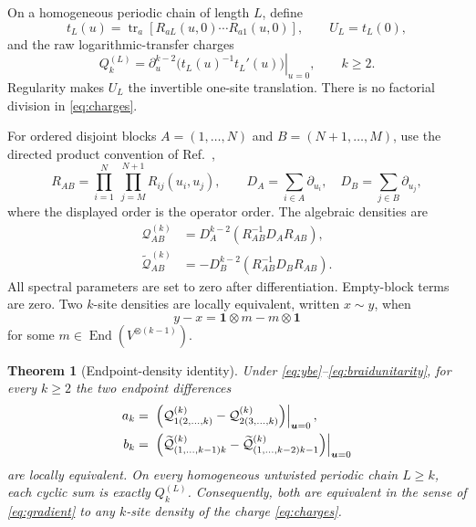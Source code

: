 \documentclass[11pt,a4paper]{article}
\newtheorem{theorem}{Theorem}[section]
\theoremstyle{definition}
\theoremstyle{remark}
\newcommand{\End}{\operatorname{End}}
\newcommand{\tr}{\operatorname{tr}}
\newcommand{\cQ}{\mathcal{Q}}
\newcommand{\tcQ}{\widetilde{\mathcal{Q}}}
\begin{document}
On a homogeneous periodic chain of length $L$, define
\begin{equation}
 t_L(u)=\tr_a\!\left[R_{aL}(u,0)\cdots R_{a1}(u,0)\right],
 \qquad U_L=t_L(0),
 \label{eq:transfer}
\end{equation}
and the raw logarithmic-transfer charges
\begin{equation}
 Q_k^{(L)}=
 \left.\partial_u^{k-2}\bigl(t_L(u)^{-1}t_L'(u)\bigr)\right|_{u=0},
 \qquad k\geq2.
 \label{eq:charges}
\end{equation}
Regularity makes $U_L$ the invertible one-site translation.  There is no factorial
division in \eqref{eq:charges}.

For ordered disjoint blocks $A=(1,\ldots,N)$ and $B=(N+1,\ldots,M)$, use the directed
product convention of Ref.~\cite{SchoutenDeLeeuw2026},
\begin{equation}
 R_{AB}=\prod_{i=1}^{N}\ \prod_{j=M}^{N+1}R_{ij}(u_i,u_j),
 \qquad D_A=\sum_{i\in A}\partial_{u_i},\quad
 D_B=\sum_{j\in B}\partial_{u_j},
\end{equation}
where the displayed order is the operator order.  The algebraic densities are
\begin{align}
 \cQ_{AB}^{(k)}&=D_A^{k-2}\left(R_{AB}^{-1}D_A R_{AB}\right),\\
 \tcQ_{AB}^{(k)}&=-D_B^{k-2}\left(R_{AB}^{-1}D_B R_{AB}\right).
 \label{eq:algebraicdensities}
\end{align}
All spectral parameters are set to zero after differentiation.  Empty-block terms are
zero.  Two $k$-site densities are locally equivalent, written $x\sim y$, when
\begin{equation}
 y-x=\mathbf 1\otimes m-m\otimes\mathbf 1
 \label{eq:gradient}
\end{equation}
for some $m\in\End(V^{\otimes(k-1)})$.

\begin{theorem}[Endpoint-density identity]
\label{thm:main}
Under \eqref{eq:ybe}--\eqref{eq:braidunitarity}, for every $k\geq2$ the two endpoint
differences
\begin{align}
 a_k={}&\left.
 \Bigl(\cQ_{1(2,\ldots,k)}^{(k)}-
       \cQ_{2(3,\ldots,k)}^{(k)}\Bigr)\right|_{\bm u=0},
 \label{eq:aksource}\\
 b_k={}&\left.
 \Bigl(\tcQ_{(1,\ldots,k-1)k}^{(k)}-
       \tcQ_{(1,\ldots,k-2)k-1}^{(k)}\Bigr)\right|_{\bm u=0}
 \label{eq:bksource}
\end{align}
are locally equivalent.  On every homogeneous untwisted periodic chain $L\geq k$,
each cyclic sum is exactly $Q_k^{(L)}$.  Consequently, both are equivalent in the
sense of \eqref{eq:gradient} to any $k$-site density of the charge
\eqref{eq:charges}.
\end{theorem}
\end{document}
